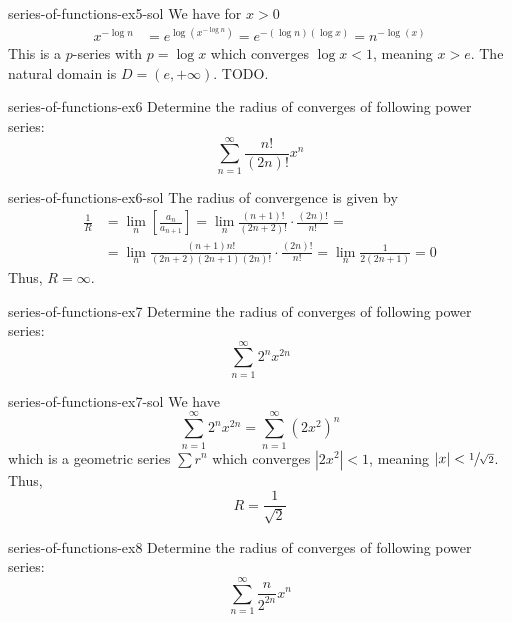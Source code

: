 \documentclass[preview]{standalone}
\begin{document}
\begin{snippetsolution}{series-of-functions-ex5-sol}{}
    We have for \(x>0\)
    \begin{align*}
        x^{-\log n} &= e^{\log(x^{-\log n})} = e^{-(\log n)(\log x)} = n^{-\log(x)}
    \end{align*}
    This is a \(p\)-series with \(p = \log x\) which converges \ifandonlyif
    \(\log x < 1\), meaning \(x > e\). The natural domain is \(D = (e, +\infty)\).
    TODO.    
\end{snippetsolution}

\begin{snippetexercise}{series-of-functions-ex6}{}
    Determine the radius of converges of following power series:
    \[
        \sum_{n=1}^\infty \frac{
            n!
        }{
            (2n)!
        }x^n
    \]
\end{snippetexercise}

\begin{snippetsolution}{series-of-functions-ex6-sol}{}
    The radius of convergence is given by
    \begin{align*}
        \frac1R &= \lim_n \left[\frac{a_n}{a_{n+1}}\right]
        = \lim_n \frac{(n+1)!}{(2n+2)!} \cdot \frac{(2n)!}{n!} = \\ 
        &= \lim_n
        \frac{(n+1)n!}{(2n+2)(2n+1)(2n)!} \cdot \frac{(2n)!}{n!}
        = \lim_n \frac{1}{2(2n+1)} = 0
    \end{align*}
    Thus, \(R=\infty\).
\end{snippetsolution}

\begin{snippetexercise}{series-of-functions-ex7}{}
    Determine the radius of converges of following power series:
    \[
        \sum_{n=1}^\infty 2^nx^{2n}
    \]
\end{snippetexercise}

\begin{snippetsolution}{series-of-functions-ex7-sol}{}
    We have
    \[
        \sum_{n=1}^\infty 2^nx^{2n}
        = \sum_{n=1}^\infty (2x^2)^n
    \]
    which is a geometric series \(\sum r^n\) which converges \ifandonlyif
    \(|2x^2| < 1\), meaning \(|x| < \sfrac{1}{\sqrt 2}\).
    Thus, \[
        R = \frac{1}{\sqrt{2}}
    \]
\end{snippetsolution}

\begin{snippetexercise}{series-of-functions-ex8}{}
    Determine the radius of converges of following power series:
    \[
        \sum_{n=1}^\infty \frac{n}{2^{2n}}x^n
    \]
\end{snippetexercise}
\end{document}
